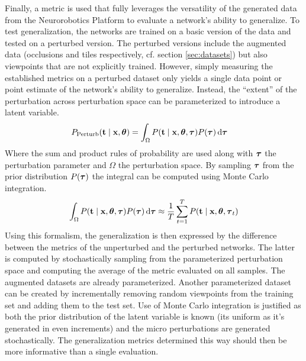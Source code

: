 Finally, a metric is used that fully leverages the versatility of the generated data from the Neurorobotics Platform to evaluate a network's ability to generalize. To test generalization, the networks are trained on a basic version of the data and tested on a perturbed version. The perturbed versions include the augmented data (occlusions and tiles respectively, cf. section \ref{sec:datasets}) but also viewpoints that are not explicitly trained. However, simply measuring the established metrics on a perturbed dataset only yields a single data point or point estimate of the network's ability to generalize. Instead, the \enquote{extent} of the perturbation across perturbation space can be parameterized to introduce a latent variable.
\begin{align}
     P_{\mathrm{Perturb}}\qty(\vb{t}\mid \vb{x},\vb*{\theta}) &= \int_{\Omega} P\qty(\vb{t}\mid \vb{x},\vb*{\theta},\vb*{\tau}) P\qty(\vb*{\tau}) \dd{\vb*{\tau}}
\end{align}
Where the sum and product rules of probability are used along with $\vb*{\tau}$ the perturbation parameter and $\Omega$ the perturbation space. By sampling $\vb*{\tau}$ from the prior distribution $P\qty(\vb*{\tau})$ the integral can be computed using Monte Carlo integration.
\begin{align}
    \int_{\Omega} P\qty(\vb{t}\mid \vb{x},\vb*{\theta},\vb*{\tau}) P\qty(\vb*{\tau}) \dd{\vb*{\tau}} \approx \frac{1}{T} \sum_{t=1}^T P\qty(\vb{t}\mid \vb{x},\vb*{\theta},\vb*{\tau}_t)
\end{align}
Using this formalism, the generalization is then expressed by the difference between the metrics of the unperturbed and the perturbed networks. The latter is computed by stochastically sampling from the parameterized perturbation space and computing the average of the metric evaluated on all samples. The augmented datasets are already parameterized. Another parameterized dataset can be created by incrementally removing random viewpoints from the training set and adding them to the test set. Use of Monte Carlo integration is justified as both the prior distribution of the latent variable is known (its uniform as it's generated in even increments) and the micro perturbations are generated stochastically. The generalization metrics determined this way should then be more informative than a single evaluation.